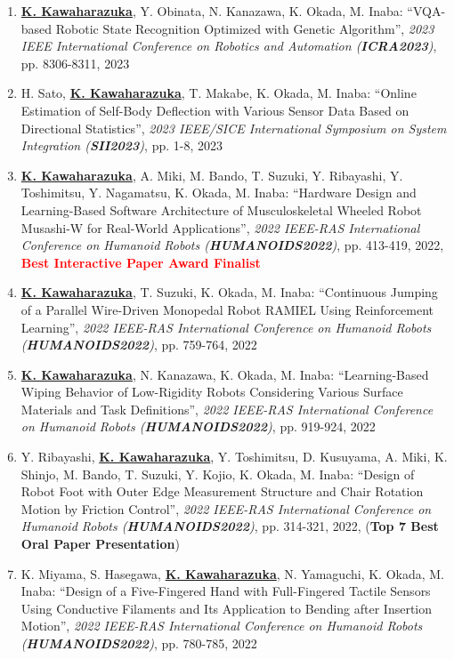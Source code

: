 \documentclass[letterpaper]{article}
\begin{document}
\begin{enumerate}
\item \underline{\textbf{K. Kawaharazuka}}, Y. Obinata, N. Kanazawa, K. Okada, M. Inaba: ``VQA-based Robotic State Recognition Optimized with Genetic Algorithm'', \textit{2023 IEEE International Conference on Robotics and Automation (\textit{\textbf{ICRA2023}})}, pp. 8306-8311, 2023
\item H. Sato, \underline{\textbf{K. Kawaharazuka}}, T. Makabe, K. Okada, M. Inaba: ``Online Estimation of Self-Body Deflection with Various Sensor Data Based on Directional Statistics'', \textit{2023 IEEE/SICE International Symposium on System Integration (\textit{\textbf{SII2023}})}, pp. 1-8, 2023
\item \underline{\textbf{K. Kawaharazuka}}, A. Miki, M. Bando, T. Suzuki, Y. Ribayashi, Y. Toshimitsu, Y. Nagamatsu, K. Okada, M. Inaba: ``Hardware Design and Learning-Based Software Architecture of Musculoskeletal Wheeled Robot Musashi-W for Real-World Applications'', \textit{2022 IEEE-RAS International Conference on Humanoid Robots (\textit{\textbf{HUMANOIDS2022}})}, pp. 413-419, 2022, \textbf{\textcolor{red}{Best Interactive Paper Award Finalist}}
\item \underline{\textbf{K. Kawaharazuka}}, T. Suzuki, K. Okada, M. Inaba: ``Continuous Jumping of a Parallel Wire-Driven Monopedal Robot RAMIEL Using Reinforcement Learning'', \textit{2022 IEEE-RAS International Conference on Humanoid Robots (\textit{\textbf{HUMANOIDS2022}})}, pp. 759-764, 2022
\item \underline{\textbf{K. Kawaharazuka}}, N. Kanazawa, K. Okada, M. Inaba: ``Learning-Based Wiping Behavior of Low-Rigidity Robots Considering Various Surface Materials and Task Definitions'', \textit{2022 IEEE-RAS International Conference on Humanoid Robots (\textit{\textbf{HUMANOIDS2022}})}, pp. 919-924, 2022
\item Y. Ribayashi, \underline{\textbf{K. Kawaharazuka}}, Y. Toshimitsu, D. Kusuyama, A. Miki, K. Shinjo, M. Bando, T. Suzuki, Y. Kojio, K. Okada, M. Inaba: ``Design of Robot Foot with Outer Edge Measurement Structure and Chair Rotation Motion by Friction Control'', \textit{2022 IEEE-RAS International Conference on Humanoid Robots (\textit{\textbf{HUMANOIDS2022}})}, pp. 314-321, 2022, (\textbf{Top 7 Best Oral Paper Presentation})
\item K. Miyama, S. Hasegawa, \underline{\textbf{K. Kawaharazuka}}, N. Yamaguchi, K. Okada, M. Inaba: ``Design of a Five-Fingered Hand with Full-Fingered Tactile Sensors Using Conductive Filaments and Its Application to Bending after Insertion Motion'', \textit{2022 IEEE-RAS International Conference on Humanoid Robots (\textit{\textbf{HUMANOIDS2022}})}, pp. 780-785, 2022

\end{enumerate}
\end{document}
